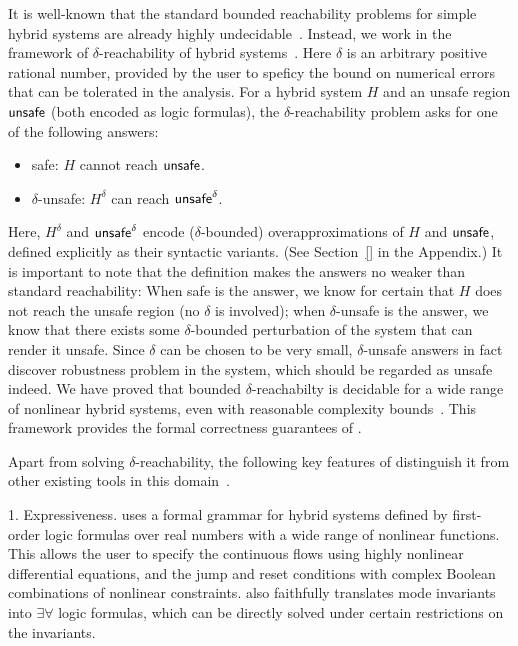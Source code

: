 It is well-known that the standard bounded reachability problems for
simple hybrid systems are already highly
undecidable~\cite{DBLP:conf/rex/AlurD91,DBLP:conf/hybrid/AlurCHH92}. 
Instead, we work in the framework of $\delta$-reachability of hybrid systems~\cite{}.
Here $\delta$ is an arbitrary positive rational number, provided by the user to 
speficy the bound on numerical errors that can be tolerated in the analysis. 
For a hybrid system $H$ and an unsafe region $\mathsf{unsafe}$ (both encoded as logic formulas), 
the $\delta$-reachability problem asks for one of the following answers:
\begin{itemize}
	\item {\sf safe}: $H$ cannot reach $\mathsf{unsafe}$.   
	\item {\sf $\delta$-unsafe}: $H^{\delta}$ can reach $\mathsf{unsafe}^{\delta}$. 
\end{itemize}
Here, $H^{\delta}$ and $\mathsf{unsafe}^{\delta}$ encode ($\delta$-bounded) overapproximations 
of $H$ and $\mathsf{unsafe}$, defined explicitly as their syntactic variants. (See Section~\ref{} in the Appendix.) 
It is important to note that the definition makes the answers no weaker than standard reachability:
When {\sf safe} is the answer, we know for certain that $H$ does not reach
the unsafe region (no $\delta$ is involved); when {\sf $\delta$-unsafe} is the answer,
we know that there exists some $\delta$-bounded perturbation of the system that can render it unsafe. 
Since $\delta$ can be chosen to be very small, {\sf$\delta$-unsafe} answers in fact 
discover robustness problem in the system, which should be regarded as unsafe indeed.
We have proved that bounded $\delta$-reachabilty is decidable for a wide range 
of nonlinear hybrid systems, even with reasonable complexity bounds~\cite{}. 
This framework provides the formal correctness guarantees of \dReach{}. 

Apart from solving $\delta$-reachability, the following key features of \dReach{}
distinguish it from other existing tools in this domain~\cite{DBLP:journals/jlp/FranzleTE10,
DBLP:conf/cav/BogomolovFGLPW12,
DBLP:journals/tac/AlthoffK14,
DBLP:conf/hybrid/Frehse05,DBLP:conf/icons/HerdeEFT08,DBLP:conf/rtss/ChenAS12}. 

1. Expressiveness. \dReach{} uses a formal grammar for hybrid systems defined by first-order
logic formulas over real numbers with a wide range of nonlinear functions. This allows 
the user to specify the continuous flows using highly nonlinear differential equations, 
and the jump and reset conditions with complex Boolean combinations of nonlinear constraints. 
\dReach{} also faithfully translates mode invariants into $\exists\forall$ logic formulas, 
which can be directly solved under certain restrictions on the invariants. 

